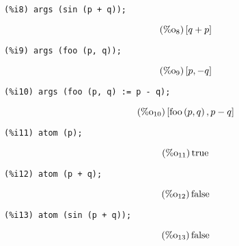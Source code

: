 \documentclass[12pt,leqno]{article}
\begin{document}
\begin{enumerate}
\begin{verbatim}
(%i8) args (sin (p + q));
\end{verbatim}
\begin{equation}
\tag{$\mathop{\mathrm{\%o}}_{8}$}\left[q+p\right]
\label{eq:doc-group1-code10-8-1}
\end{equation}
\begin{verbatim}
(%i9) args (foo (p, q));
\end{verbatim}
\begin{equation}
\tag{$\mathop{\mathrm{\%o}}_{9}$}\left[p, -q\right]
\label{eq:doc-group1-code10-9-1}
\end{equation}
\begin{verbatim}
(%i10) args (foo (p, q) := p - q);
\end{verbatim}
\begin{equation}
\tag{$\mathop{\mathrm{\%o}}_{10}$}\left[\mathop{\mathrm{foo}}\left(p, q\right), p-q\right]
\label{eq:doc-group1-code10-10-1}
\end{equation}
\begin{verbatim}
(%i11) atom (p);
\end{verbatim}
\begin{equation}
\tag{$\mathop{\mathrm{\%o}}_{11}$}\mathop{\mathrm{true}}
\label{eq:doc-group1-code10-11-1}
\end{equation}
\begin{verbatim}
(%i12) atom (p + q);
\end{verbatim}
\begin{equation}
\tag{$\mathop{\mathrm{\%o}}_{12}$}\mathop{\mathrm{false}}
\label{eq:doc-group1-code10-12-1}
\end{equation}
\begin{verbatim}
(%i13) atom (sin (p + q));
\end{verbatim}
\begin{equation}
\tag{$\mathop{\mathrm{\%o}}_{13}$}\mathop{\mathrm{false}}
\label{eq:doc-group1-code10-13-1}
\end{equation}



\end{enumerate}
\end{document}
